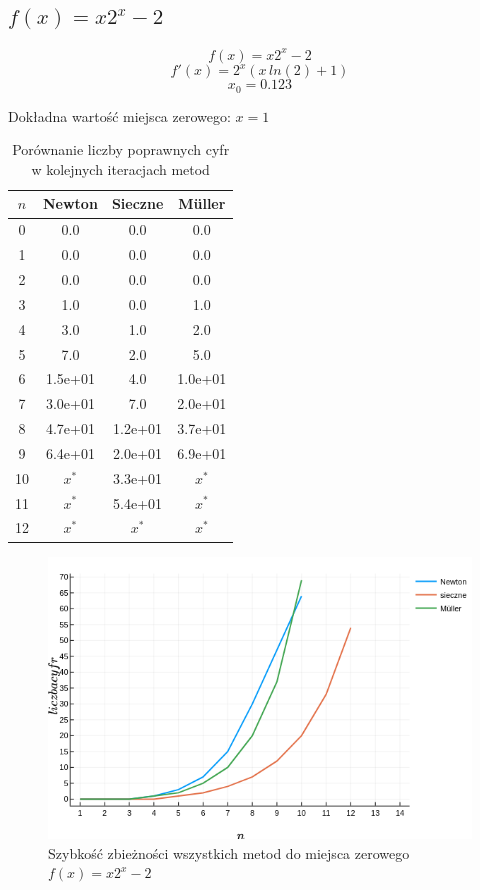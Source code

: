 \documentclass[12pt]{article}
\begin{document}
\subsection{$f(x) = x2^x -2$}

\[f(x) = x2^x -2\]
\[f'(x) = 2^x (x\,ln(2)+1)\]
\[x_0 = 0.123\]
\begin{center}
    Dokładna wartość miejsca zerowego: $x = 1$
\end{center}

\begin{table}[H]
\centering
\begin{tabular}{|c|c|c|c|}
    \hline
    $n$ & Newton & Sieczne & Müller  \\ \hline\hline
    0  & 0.0     & 0.0     & 0.0     \\ \hline
    1  & 0.0     & 0.0     & 0.0     \\ \hline
    2  & 0.0     & 0.0     & 0.0     \\ \hline
    3  & 1.0     & 0.0     & 1.0     \\ \hline
    4  & 3.0     & 1.0     & 2.0     \\ \hline
    5  & 7.0     & 2.0     & 5.0     \\ \hline
    6  & 1.5e+01 & 4.0     & 1.0e+01 \\ \hline
    7  & 3.0e+01 & 7.0     & 2.0e+01 \\ \hline
    8  & 4.7e+01 & 1.2e+01 & 3.7e+01 \\ \hline
    9  & 6.4e+01 & 2.0e+01 & 6.9e+01 \\ \hline
    10 & $x^*$   & 3.3e+01 & $x^*$   \\ \hline
    11 & $x^*$   & 5.4e+01 & $x^*$   \\ \hline
    12 & $x^*$   & $x^*$   & $x^*$   \\ \hline
\end{tabular}
\caption{Porównanie liczby poprawnych cyfr w kolejnych iteracjach metod}
\label{table:table4}
\end{table}

\begin{figure}[H]
    \centering
    \includegraphics[scale=0.7]{plot4.png}
\caption{Szybkość zbieżności wszystkich metod do miejsca 
            zerowego $f(x) = x2^x -2$}
\label{figure:plot4}
\end{figure}
\end{document}
